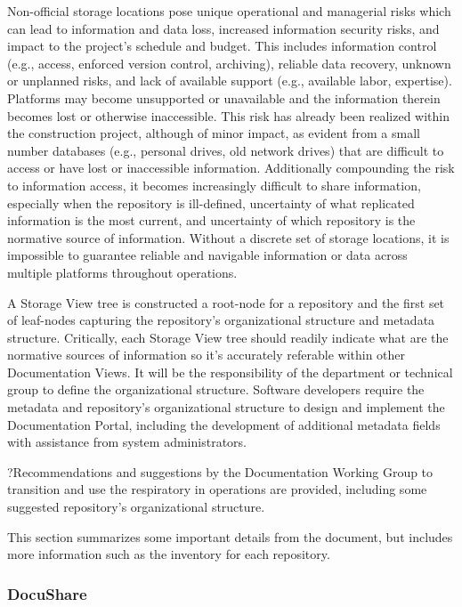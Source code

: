 Non-official storage locations pose unique operational and managerial risks which can lead to information and data loss, increased information security risks, and impact to the project's schedule and budget.
This includes information control (e.g., access, enforced version control, archiving), reliable data recovery, unknown or unplanned risks, and lack of available support (e.g., available labor, expertise).
Platforms may become unsupported or unavailable and the information therein becomes lost or otherwise inaccessible.
This risk has already been realized within the construction project, although of minor impact, as evident from a small number databases (e.g., personal drives, old network drives) that are difficult to access or have lost or inaccessible information. 
Additionally compounding the risk to information access, it becomes increasingly difficult to share information, especially when the repository is ill-defined, uncertainty of what replicated information is the most current, and uncertainty of which repository is the normative source of information.
Without a discrete set of storage locations, it is impossible to guarantee reliable and navigable information or data across multiple platforms throughout operations.

A Storage View tree is constructed a root-node for a repository and the first set of leaf-nodes capturing the repository's organizational structure and metadata structure.
Critically, each Storage View tree should readily indicate what are the normative sources of information so it's accurately referable within other Documentation Views.
It will be the responsibility of the department or technical group to define the organizational structure.
Software developers require the metadata and repository's organizational structure to design and implement the Documentation Portal, including the development of additional metadata fields with assistance from system administrators.

?Recommendations and suggestions by the Documentation Working Group to transition and use the respiratory in operations are provided, including some suggested repository's organizational structure.

This section summarizes some important details from the document, but  includes more information such as the inventory for each repository.

\subsubsection{DocuShare}

